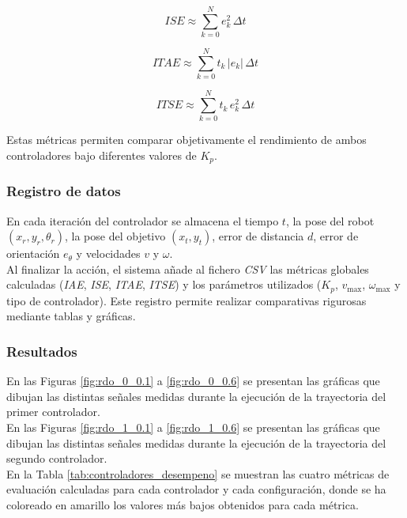 \begin{equation}
    \mathrm{\textit{ISE}} \approx \sum_{k=0}^{N} e_k^2 \, \Delta t
\end{equation}

\begin{equation}
    \mathrm{\textit{ITAE}} \approx \sum_{k=0}^{N} t_k \, |e_k| \, \Delta t
\end{equation}

\begin{equation}
    \mathrm{\textit{ITSE}} \approx \sum_{k=0}^{N} t_k \, e_k^2 \, \Delta t
\end{equation}

Estas métricas permiten comparar objetivamente el rendimiento de ambos controladores 
bajo diferentes valores de $K_p$.

\subsubsection*{Registro de datos}
En cada iteración del controlador se almacena el tiempo $t$,
la pose del robot $(x_r, y_r, \theta_r)$, la pose del objetivo $(x_t, y_t)$,
error de distancia $d$, error de orientación $e_\theta$ y velocidades $v$ y $\omega$. \\

Al finalizar la acción, el sistema añade al fichero \textit{CSV} las métricas globales 
calculadas (\textit{IAE}, \textit{ISE}, \textit{ITAE}, \textit{ITSE}) y los parámetros utilizados ($K_p$, $v_{\max}$, 
$\omega_{\max}$ y tipo de controlador). Este registro permite realizar comparativas 
rigurosas mediante tablas y gráficas.

\subsubsection*{Resultados}
En las Figuras \ref{fig:rdo_0_0.1} a \ref{fig:rdo_0_0.6} se presentan las gráficas que dibujan 
las distintas señales medidas durante la ejecución de la trayectoria del primer 
controlador. \\

En las Figuras \ref{fig:rdo_1_0.1} a \ref{fig:rdo_1_0.6} se presentan las gráficas que dibujan 
las distintas señales medidas durante la ejecución de la trayectoria del segundo 
controlador. \\

En la Tabla \ref{tab:controladores_desempeno} se muestran las cuatro métricas de 
evaluación calculadas para cada controlador y cada configuración, donde se ha 
coloreado en amarillo los valores más bajos obtenidos para cada métrica. \\


